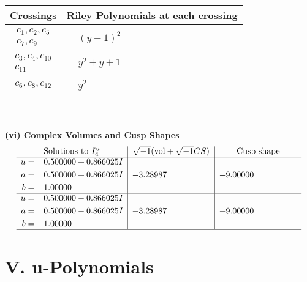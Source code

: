 \documentclass[1p]{elsarticle_modified}
\theoremstyle{definition}
\newcommand{\I}{\sqrt{-1}}
\begin{document}
\begin{tabular}{m{50pt}|m{274pt}}
Crossings & \hspace{64pt}Riley Polynomials at each crossing \\
\hline $$\begin{aligned}c_{1},c_{2},c_{5}\\c_{7},c_{9}\end{aligned}$$&$\begin{aligned}
&(y-1)^2
\end{aligned}$\\
\hline $$\begin{aligned}c_{3},c_{4},c_{10}\\c_{11}\end{aligned}$$&$\begin{aligned}
&y^2+y+1
\end{aligned}$\\
\hline $$\begin{aligned}c_{6},c_{8},c_{12}\end{aligned}$$&$\begin{aligned}
&y^2
\end{aligned}$\\
\hline
\end{tabular}\\~\\
\newpage\flushleft \textbf{(vi) Complex Volumes and Cusp Shapes}
$$\begin{array}{c|c|c}  
\text{Solutions to }I^u_{4}& \I (\text{vol} + \sqrt{-1}CS) & \text{Cusp shape}\\
 \hline 
\begin{aligned}
u &= \phantom{-}0.500000 + 0.866025 I \\
a &= \phantom{-}0.500000 + 0.866025 I \\
b &= -1.00000\phantom{ +0.000000I}\end{aligned}
 & -3.28987\phantom{ +0.000000I} & -9.00000\phantom{ +0.000000I} \\ \hline\begin{aligned}
u &= \phantom{-}0.500000 - 0.866025 I \\
a &= \phantom{-}0.500000 - 0.866025 I \\
b &= -1.00000\phantom{ +0.000000I}\end{aligned}
 & -3.28987\phantom{ +0.000000I} & -9.00000\phantom{ +0.000000I}\\
 \hline 
 \end{array}$$\newpage
\newpage\renewcommand{\arraystretch}{1}
\centering \section*{ V. u-Polynomials}
\end{document}
